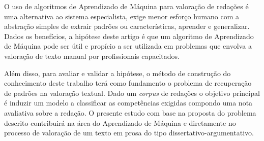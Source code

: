 O uso de algoritmos de Aprendizado de Máquina para valoração de redações é uma
alternativa ao sistema especialista, exige menor esforço humano com a 
abstração simples de extrair padrões ou características, aprender e generalizar.
Dados os benefícios, a hipótese deste artigo é que um algoritmo de Aprendizado 
de Máquina pode ser útil e propício a ser utilizada em problemas que envolva a 
valoração de texto manual por profissionais capacitados. 

Além disso, para avaliar e validar a hipótese, o método de construção do 
conhecimento deste trabalho terá como fundamento o problema de recuperação de 
padrões na valoração textual. Dado um \textit{corpus} de redações o objetivo 
principal é induzir um modelo a classificar as competências exigidas compondo 
uma nota avaliativa sobre a redação. O presente estudo com base na proposta do 
problema descrito contribuirá na área do Aprendizado de Máquina e diretamente 
no processo de valoração de um texto em prosa do tipo 
dissertativo-argumentativo.